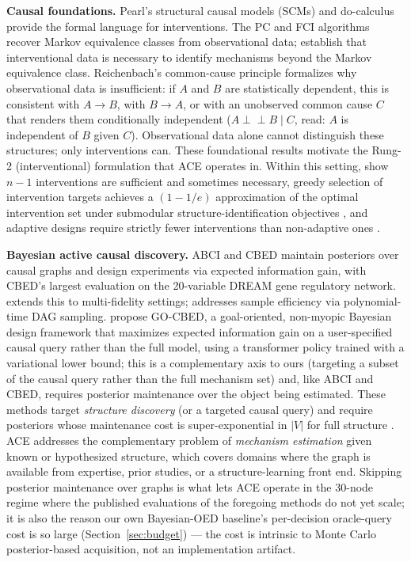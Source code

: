 \documentclass{article}
\theoremstyle{plain}
\theoremstyle{definition}
\theoremstyle{remark}
\begin{document}
\textbf{Causal foundations.} Pearl's structural causal models (SCMs) and do-calculus \citep{pearl2009causality,pearl1995causal} provide the formal language for interventions. The PC and FCI algorithms \citep{spirtes2000causation} recover Markov equivalence classes from observational data; \citet{peters2017elements} establish that interventional data is necessary to identify mechanisms beyond the Markov equivalence class. Reichenbach's common-cause principle \citep{reichenbach1956} formalizes why observational data is insufficient: if $A$ and $B$ are statistically dependent, this is consistent with $A \to B$, with $B \to A$, or with an unobserved common cause $C$ that renders them conditionally independent ($A \perp\!\!\!\!\perp B \mid C$, read: $A$ is independent of $B$ given $C$). Observational data alone cannot distinguish these structures; only interventions can. These foundational results motivate the Rung-2 (interventional) formulation that ACE operates in. Within this setting, \citet{eberhardt2005number,eberhardt2006n} show $n-1$ interventions are sufficient and sometimes necessary, greedy selection of intervention targets achieves a $(1-1/e)$ approximation of the optimal intervention set under submodular structure-identification objectives \citep{shanmugam2015learning}, and adaptive designs require strictly fewer interventions than non-adaptive ones \citep{hauser2012characterization,cho2016reconstructing}.

\textbf{Bayesian active causal discovery.} ABCI \citep{toth2022active} and CBED \citep{tigas2022interventions} maintain posteriors over causal graphs and design experiments via expected information gain, with CBED's largest evaluation on the 20-variable DREAM gene regulatory network. \citet{zhang2023bayesian} extends this to multi-fidelity settings; \citet{zhou2024sample} addresses sample efficiency via polynomial-time DAG sampling. \citet{zhang2025gocbed} propose GO-CBED, a goal-oriented, non-myopic Bayesian design framework that maximizes expected information gain on a user-specified causal query rather than the full model, using a transformer policy trained with a variational lower bound; this is a complementary axis to ours (targeting a subset of the causal query rather than the full mechanism set) and, like ABCI and CBED, requires posterior maintenance over the object being estimated. These methods target \emph{structure discovery} (or a targeted causal query) and require posteriors whose maintenance cost is super-exponential in $|V|$ for full structure \citep{chickering1996learning}. ACE addresses the complementary problem of \emph{mechanism estimation} given known or hypothesized structure, which covers domains where the graph is available from expertise, prior studies, or a structure-learning front end. Skipping posterior maintenance over graphs is what lets ACE operate in the 30-node regime where the published evaluations of the foregoing methods do not yet scale; it is also the reason our own Bayesian-OED baseline's per-decision oracle-query cost is so large (Section~\ref{sec:budget}) --- the cost is intrinsic to Monte Carlo posterior-based acquisition, not an implementation artifact.
\end{document}
